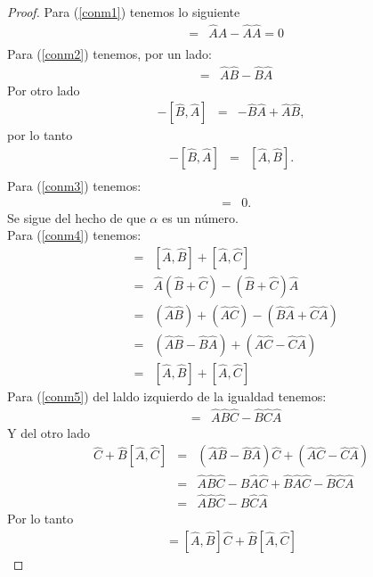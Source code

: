 \documentclass[letterpaper,12pt,oneside]{book}
\begin{document}
\begin{proof}
Para (\ref{conm1}) tenemos lo siguiente
%
\begin{eqnarray}
[\hat A, \hat A] &=&\hat A\hat A -\hat A\hat A=0\\
\end{eqnarray}
%
Para (\ref{conm2}) tenemos, por un lado:
%
\begin{eqnarray}
[\hat A, \hat B] &=&\hat A\hat B -\hat B\hat A
\end{eqnarray}
%
Por otro lado
%
\begin{eqnarray}
-[\hat B , \hat A] &=&-\hat B\hat A +\hat A\hat B,
\end{eqnarray}
por lo tanto
%
\begin{eqnarray}
-[\hat B , \hat A] &=&	[\hat A , \hat B].\\
\end{eqnarray}
%
Para (\ref{conm3}) tenemos:
%
\begin{eqnarray}
[\hat A, \alpha] &=& 0.
\end{eqnarray}
%
Se sigue del hecho de que $\alpha$ es un n\'umero.\\
Para (\ref{conm4}) tenemos:
%
\begin{eqnarray}
[\hat A, \hat B + \hat C] &=& [\hat A, \hat B] + [\hat A, \hat C]\\
&=& \hat A(\hat B + \hat C) - (\hat B + \hat C ) \hat A\\
&=& (\hat A \hat B) + (\hat A \hat C) - (\hat B \hat A + \hat C \hat A)\\
&=& (\hat A \hat B - \hat B \hat A) + (\hat A \hat C - \hat C \hat A)\\
&=& [\hat A, \hat B] + [\hat A, \hat C]
\end{eqnarray}
%
Para (\ref{conm5}) del laldo  izquierdo de la igualdad tenemos:
%
\begin{eqnarray}
[\hat A, \hat B \hat C] &=& \hat A \hat B \hat C - \hat B \hat C \hat A
\end{eqnarray}
%
Y del otro lado
%
\begin{eqnarray}
[\hat A, \hat B]\hat C +  \hat B[\hat A,\hat C] &=& (\hat A \hat B - \hat B \hat A ) \hat C + (\hat A \hat C - \hat C \hat A)\\ 
&=&\hat A \hat B \hat C - \hat B \hat A \hat C + \hat B \hat A \hat C - \hat B \hat C \hat A\\
&=& \hat A \hat B \hat C -  \hat B \hat C \hat A
\end{eqnarray}
%
Por lo tanto 
%
\begin{eqnarray}
[\hat A, \hat B \hat C] = [\hat A,\hat B ]\hat C +\hat B [\hat A ,\hat C]

\end{eqnarray}
\end{proof}
\end{document}
